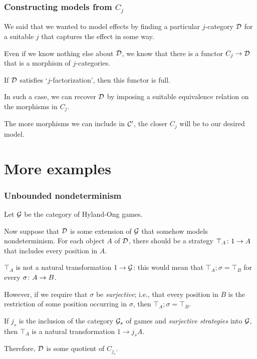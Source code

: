 \documentclass{beamer}
\begin{document}
\begin{frame}
  \frametitle{Constructing models from $C_j$}

  We said that we wanted to model effects by finding a particular $j$-category ${\mathcal{D}}$ for a suitable $j$ that captures the effect in some way.
  \pause

  Even if we know nothing else about ${\mathcal{D}}$, we know that there is a functor $C_j\to{\mathcal{D}}$ that is a morphism of $j$-categories.
  \pause

  If ${\mathcal{D}}$ satisfies `$j$-factorization', then this functor is full.
  \pause

  In such a case, we can recover ${\mathcal{D}}$ by imposing a suitable equivalence relation on the morphisms in $C_j$.
  \pause

  The more morphisms we can include in ${\mathcal{C}}'$, the closer $C_j$ will be to our desired model.
\end{frame}

\section{More examples}

\begin{frame}
  \frametitle{Unbounded nondeterminism}

  Let $\mathcal G$ be the category of Hyland-Ong games.  
  \pause

  Now suppose that ${\mathcal{D}}$ is some extension of $\mathcal G$ that somehow models nondeterminism.  
  For each object $A$ of ${\mathcal{D}}$, there should be a strategy $\top_A\colon 1 \to A$ that includes every position in $A$.
  \pause

  $\top_A$ is not a natural transformation $1\to\mathcal G$: this would mean that $\top_A;\sigma=\top_B$ for every $\sigma\colon A \to B$.
  \pause

  However, if we require that $\sigma$ be \emph{surjective}; i.e., that every position in $B$ is the restriction of some position occurring in $\sigma$, then $\top_A;\sigma=\top_B$.  
  \pause

  If $j_s$ is the inclusion of the category $\mathcal G_s$ of games and \emph{surjective strategies} into $\mathcal G$, then $\top_A$ is a natural transformation $1\to j_s A$.
  \pause

  Therefore, ${\mathcal{D}}$ is some quotient of $C_{j_s}$.  
\end{frame}
\end{document}

